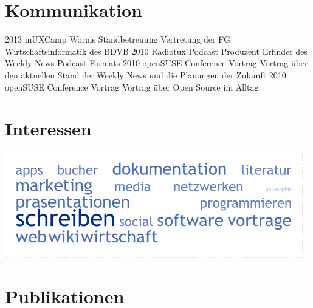 \documentclass[a4paper]{friggeri-cv} %
\begin{document}
\section{Kommunikation}

\begin{entrylist}
\entry
{2013}
{mUXCamp Worms}
{Standbetreuung}
{Vertretung der FG Wirtschaftsinformatik des BDVB}
\entry
{2010}
{Radiotux Podcast}
{Produzent}
{Erfinder des Weekly-News Podcast-Formats}
\entry
{2010}
{openSUSE Conference}
{Vortrag}
{Vortrag über den aktuellen Stand der Weekly News und die Planungen der Zukunft}
\entry
{2010}
{openSUSE Conference}
{Vortrag}
{Vortrag über Open Source im Alltag}
\end{entrylist}


\section{Interessen}
\includegraphics[width=13cm]{../Pictures/Interessen.png}

\newpage
\section{Publikationen}


\end{document}
